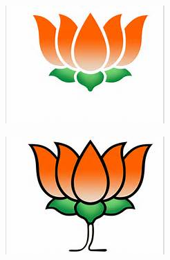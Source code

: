 \begin{figure}[!ht]
\begin{subfigure}{0.32\columnwidth}
    \end{subfigure}
	\centering
    \begin{subfigure}{0.32\columnwidth}
        \centering
        \includegraphics[width=\columnwidth]{bjp1.jpg}
    \end{subfigure}
    \begin{subfigure}{0.32\columnwidth}
        \centering
        \includegraphics[width=\columnwidth]{bjp2.jpg}
    \end{subfigure}
	\begin{subfigure}{0.32\columnwidth}
        \centering

\end{subfigure}
\end{figure}
